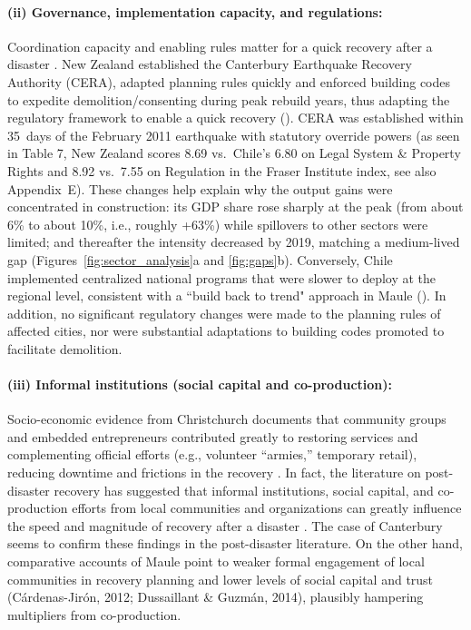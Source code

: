 \documentclass[12pt]{article}
\begin{document}
\paragraph{(ii) Governance, implementation capacity, and regulations:} Coordination capacity and enabling rules matter for a quick recovery after a disaster \parencite{storr2016community, storr2017sandy, rayamajhee2022coproduction}. New Zealand established the Canterbury Earthquake Recovery Authority (CERA), adapted planning rules quickly and enforced building codes to expedite demolition/consenting during peak rebuild years, thus adapting the regulatory framework to enable a quick recovery (\cite{miller2013estimating, doyle2015short}). CERA was established within 35~days of the February 2011 earthquake with statutory override powers (as seen in Table 7, New Zealand scores 8.69 vs.\ Chile's 6.80 on Legal System \& Property Rights and 8.92 vs.\ 7.55 on Regulation in the Fraser Institute index, see also Appendix~E). These changes help explain why the output gains were concentrated in construction: its GDP share rose sharply at the peak (from about 6\% to about 10\%, i.e., roughly +63\%) while spillovers to other sectors were limited; and thereafter the intensity decreased by 2019, matching a medium-lived gap (Figures~\ref{fig:sector_analysis}a and \ref{fig:gaps}b). Conversely, Chile implemented centralized national programs that were slower to deploy at the regional level, consistent with a “build back to trend" approach in Maule (\cite{eclac2010overview, cardenas2018talca, cardenasjiron2012chilean}). In addition, no significant regulatory changes were made to the planning rules of affected cities, nor were substantial adaptations to building codes promoted to facilitate demolition.   

\paragraph{(iii) Informal institutions (social capital and co-production):} Socio-economic evidence from Christchurch documents that community groups and embedded entrepreneurs contributed greatly to restoring services and complementing official efforts (e.g., volunteer “armies,” temporary retail), reducing downtime and frictions in the recovery \parencite{grube2018embedded, parker2016five}. In fact, the literature on post-disaster recovery has suggested that informal institutions, social capital, and co-production efforts from local communities and organizations can greatly influence the speed and magnitude of recovery after a disaster \parencite{storr2016community, storr2017sandy, rayamajhee2022coproduction}. The case of Canterbury seems to confirm these findings in the post-disaster literature. On the other hand, comparative accounts of Maule point to weaker formal engagement of local communities in recovery planning and lower levels of social capital and trust (Cárdenas-Jirón, 2012; Dussaillant \& Guzmán, 2014), plausibly hampering multipliers from co-production. 
\end{document}

